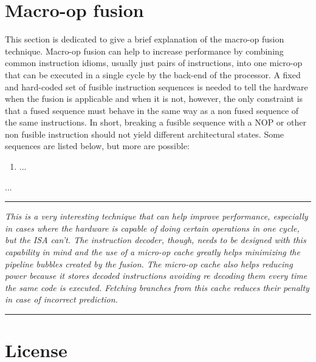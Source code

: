 \documentclass{article}
\begin{document}
    \section[Macro-op fusion]{Macro-op fusion}

        This section is dedicated to give a brief explanation of the macro-op fusion technique. Macro-op fusion can help to increase performance by combining common instruction idioms, usually just pairs of instructions, into one micro-op that can be executed in a single cycle by the back-end of the processor. A fixed and hard-coded set of fusible instruction sequences is needed to tell the hardware when the fusion is applicable and when it is not, however, the only constraint is that a fused sequence must behave in the same way as a non fused sequence of the same instructions. In short, breaking a fusible sequence with a NOP or other non fusible instruction should not yield different architectural states. Some sequences are listed below, but more are possible:

        \begin{enumerate}

            \item ...

        \end{enumerate}

        ...

        \par\noindent\rule{\textwidth}{0.4pt}
        \textit{This is a very interesting technique that can help improve performance, especially in cases where the hardware is capable of doing certain operations in one cycle, but the ISA can't. The instruction decoder, though, needs to be designed with this capability in mind and the use of a micro-op cache greatly helps minimizing the pipeline bubbles created by the fusion. The micro-op cache also helps reducing power because it stores decoded instructions avoiding re decoding them every time the same code is executed. Fetching branches from this cache reduces their penalty in case of incorrect prediction.}
        \par\noindent\rule{\textwidth}{0.4pt}

    \clearpage


    \section[License]{License}
\end{document}
